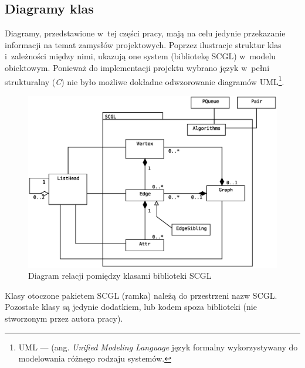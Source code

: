 \documentclass[a4paper,12pt,polish,twoside,openright]{thesis}
\begin{document}
\subsection{Diagramy klas}
Diagramy, przedstawione w~tej części pracy, mają na celu jedynie przekazanie informacji na temat zamysłów projektowych.
Poprzez ilustracje struktur klas i~zależności między nimi, ukazują one system (bibliotekę SCGL) w~modelu obiektowym.
Ponieważ do implementacji projektu wybrano język w~pełni strukturalny (\emph{C}) nie było możliwe dokładne odwzorowanie diagramów UML\footnote{UML --- (ang. \emph{Unified Modeling Language} język formalny wykorzystywany do modelowania różnego rodzaju systemów.}.

\begin{figure}[htb]
	\begin{center}
		\includegraphics[width=1.00\textwidth]{gfx/class_01.eps}
		\caption{Diagram relacji pomiędzy klasami biblioteki SCGL}
	\end{center}
\end{figure}
Klasy otoczone pakietem SCGL (ramka) należą do przestrzeni nazw SCGL.
Pozostałe klasy są jedynie dodatkiem, lub kodem spoza biblioteki (nie stworzonym przez autora pracy).
\end{document}

